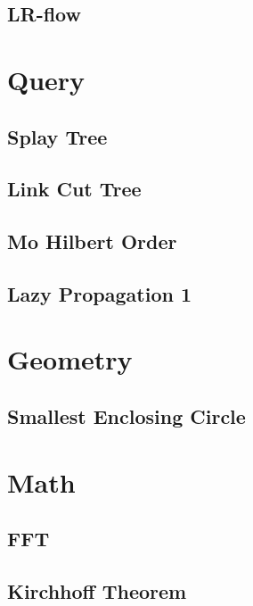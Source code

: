 \documentclass[10pt,landscape,a4paper,twocolumn]{article}
\begin{document}
\subsection{LR-flow}


%
\section{Query}

\subsection{Splay Tree}


\subsection{Link Cut Tree}


\subsection{Mo Hilbert Order}


\subsection{Lazy Propagation 1}


\section{Geometry}

\subsection{Smallest Enclosing Circle}


\section{Math}
\subsection{FFT}


\subsection{Kirchhoff Theorem}

\end{document}
